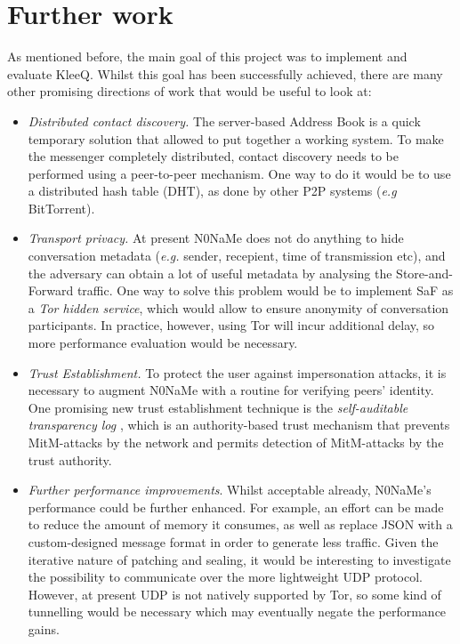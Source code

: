 \documentclass[a4paper, twoside, 12pt]{report}
\newcommand{\funkytt}{\fontfamily{AnonymousPro}\selectfont}
\begin{document}
\section{Further work}
As mentioned before, the main goal of this project was to implement and evaluate KleeQ. Whilst this goal has been successfully achieved, there are many other promising directions of work that would be useful to look at:
\begin{itemize}
    \item \textit{Distributed contact discovery.} The server-based Address Book is a quick temporary solution that allowed to put together a working system. To make the messenger completely distributed, contact discovery needs to be performed using a peer-to-peer mechanism. One way to do it would be to use a distributed hash table (DHT), as done by other P2P systems (\textit{e.g} BitTorrent).
    \item \textit{Transport privacy.} At present {\funkytt N0NaMe} does not do anything to hide conversation metadata (\textit{e.g.} sender, recepient, time of transmission etc), and the adversary can obtain a lot of useful metadata by analysing the Store-and-Forward traffic. One way to solve this problem would be to implement SaF as a \emph{Tor hidden service}, which would allow to ensure anonymity of conversation participants. In practice, however, using Tor will incur additional delay, so more performance evaluation would be necessary.
    \item \textit{Trust Establishment.} To protect the user against impersonation attacks, it is necessary to augment {\funkytt N0NaMe} with a routine for verifying peers' identity. One promising new trust establishment technique is the \emph{self-auditable transparency log} \cite{melara2014coniks}, which is an authority-based trust mechanism that prevents MitM-attacks by the network and permits detection of MitM-attacks by the trust authority.
    \item \textit{Further performance improvements}. Whilst acceptable already, {\funkytt N0NaMe}'s performance could be further enhanced. For example, an effort can be made to reduce the amount of memory it consumes, as well as replace JSON with a custom-designed message format in order to generate less traffic. Given the iterative nature of patching and sealing, it would be interesting to investigate the possibility to communicate over the more lightweight UDP protocol. However, at present UDP is not natively supported by Tor, so some kind of tunnelling would be necessary which may eventually negate the performance gains.
\end{itemize}
\end{document}
